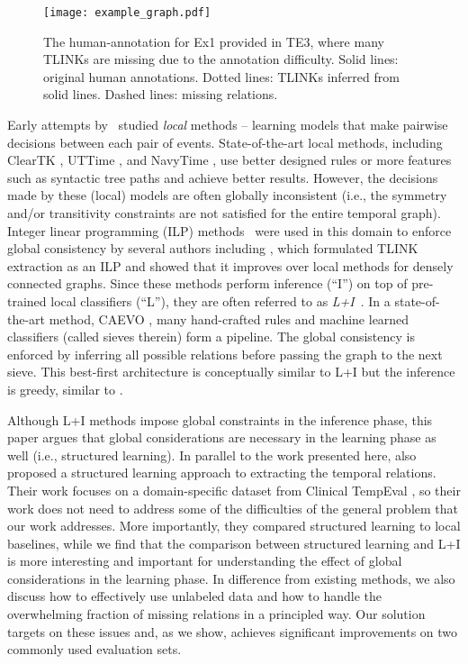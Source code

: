 \documentclass[11pt,letterpaper]{article}
\newcommand{\final}[1]{#1}
\begin{document}
\begin{figure}[htbp!]
	\centering
	\texttt{[image: example\_graph.pdf]}
	\caption{\small The human-annotation for Ex1 provided in TE3, where many TLINKs are missing due to the annotation difficulty. Solid lines: original human annotations. Dotted lines: TLINKs inferred from solid lines. Dashed lines: missing relations.}
	\label{fig:graph}
\end{figure}

\final{Early attempts 
by}~\citet{mani2006machine,chambers2007classifying, bethard2007timelines, verhagen2008temporal} studied \textit{local} methods -- learning models that make pairwise decisions between each pair of events. 
State-of-the-art local methods, including ClearTK \citep{bethard2013cleartk}, UTTime \citep{laokulrat2013uttime}, and NavyTime \citep{chambers2013navytime}, use better designed rules or more features such as syntactic tree paths and achieve better results.
However, \final{the decisions made by these (local) models are often globally inconsistent} (i.e., the symmetry and/or transitivity constraints are not satisfied for the entire temporal graph). 
Integer linear programming (ILP) methods~\cite{RothYi04} were used in this domain to enforce global consistency by several authors including \citet{BDLB06, ChambersJu08, DoLuRo12}, which formulated TLINK extraction as an ILP and showed that it improves over local methods for densely connected graphs. 
Since these methods perform inference (``I'') on top of pre-trained local classifiers (``L''), they are often referred to as {\textit{L+I}}~\citep{PRYZ05}.
In a state-of-the-art method, CAEVO \citep{chambers2014dense}, many hand-crafted rules and machine learned classifiers (called sieves therein) form a pipeline. The global consistency is enforced by inferring all possible relations before passing the graph to the next sieve. This best-first architecture is conceptually \final{similar to} L+I but \final{the inference is greedy}, similar to \citet{mani2007three,verhagen2008temporal}.

\final{Although L+I methods impose global constraints in the inference phase, this paper argues that global considerations are necessary in the learning phase as well (i.e., structured learning).
In parallel to the work presented here, \citet{EACL2017StructuredTemporal} also proposed a structured learning approach to extracting the temporal relations. Their work focuses on a domain-specific dataset from Clinical TempEval \citep{bethard2016semeval}, so their work does not need to address some of the difficulties of the general problem that our work addresses. More importantly, they compared structured learning to local baselines, while we find that the comparison between structured learning and L+I is more interesting and important for understanding the effect of global considerations in the learning phase.
In difference from existing methods, we also discuss how to effectively use unlabeled data and how to handle the overwhelming fraction of missing relations in a principled way.  
Our solution targets on these issues and, as we show, achieves significant improvements on two commonly used evaluation sets.}
\end{document}
